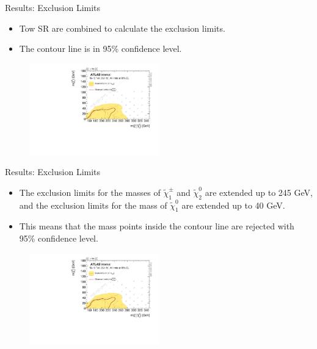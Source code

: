 \documentclass[mathserif,serif]{beamer}
\begin{document}
\begin{frame}{Results: Exclusion Limits}
\begin{itemize}
\item Tow SR are combined to calculate the exclusion limits.
\item The contour line is in 95\% confidence level.
\end{itemize}
\begin{figure}
\centering
\includegraphics[width=0.5\textwidth]{data/plot/HistFitterResults/contourPlotterWhSS_upperLimit.pdf}
\end{figure}
\end{frame}

\begin{frame}{Results: Exclusion Limits}
\begin{itemize}
\item The exclusion limits for the masses of $\tilde{\chi}_1^\pm$ and $\tilde{\chi}_2^0$ are extended up to 245 GeV, and the exclusion limits for the mass of $\tilde{\chi}_1^0$ are extended up to 40 GeV.
\item This means that the mass points inside the contour line are rejected with 95\% confidence level.
\end{itemize}
\begin{figure}
\centering
\includegraphics[width=0.5\textwidth]{data/plot/HistFitterResults/contourPlotterWhSS_upperLimit.pdf}
\end{figure}
\end{frame}
\end{document}
